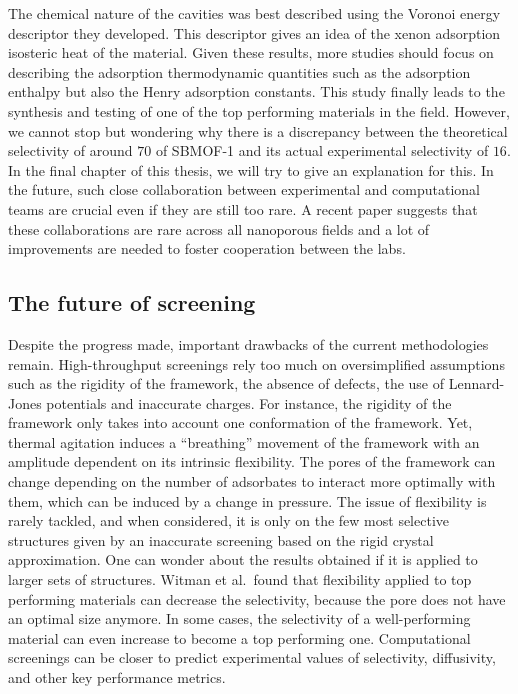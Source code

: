 \documentclass[main.tex]{subfiles}
\begin{document}
The chemical nature of the cavities was best described using the Voronoi energy descriptor they developed. This descriptor gives an idea of the xenon adsorption isosteric heat of the material. Given these results, more studies should focus on describing the adsorption thermodynamic quantities such as the adsorption enthalpy but also the Henry adsorption constants. This study finally leads to the synthesis and testing of one of the top performing materials in the field. However, we cannot stop but wondering why there is a discrepancy between the theoretical selectivity of around $70$ of SBMOF-1 and its actual experimental selectivity of $16$. In the final chapter of this thesis, we will try to give an explanation for this. In the future, such close collaboration between experimental and computational teams are crucial even if they are still too rare. A recent paper suggests that these collaborations are rare across all nanoporous fields and a lot of improvements are needed to foster cooperation between the labs.\autocite{Li_2022}


\subsection{The future of screening}

Despite the progress made, important drawbacks of the current methodologies remain. High-throughput screenings rely too much on oversimplified assumptions such as the rigidity of the framework, the absence of defects, the use of Lennard-Jones potentials and inaccurate charges. For instance, the rigidity of the framework only takes into account one conformation of the framework. Yet, thermal agitation induces a ``breathing'' movement of the framework with an amplitude dependent on its intrinsic flexibility. The pores of the framework can change depending on the number of adsorbates to interact more optimally with them, which can be induced by a change in pressure. The issue of flexibility is rarely tackled, and when considered, it is only on the few most selective structures given by an inaccurate screening based on the rigid crystal approximation. One can wonder about the results obtained if it is applied to larger sets of structures. Witman et al.\ found that flexibility applied to top performing materials can decrease the selectivity, because the pore does not have an optimal size anymore.\autocite{Witman_2017} In some cases, the selectivity of a well-performing material can even increase to become a top performing one. Computational screenings can be closer to predict experimental values of selectivity, diffusivity, and other key performance metrics.
\end{document}
